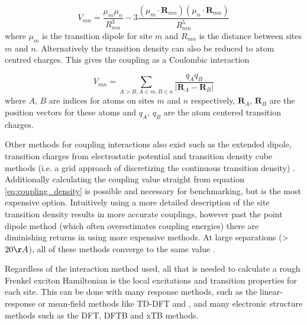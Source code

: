 \begin{equation}
    V_{mn} = \frac{\mu_m \mu_n}{R_{mn}^3} - 3 \frac{\left(\mu_m \cdot \mathbf{R}_{mn}\right) \left( \mu_n \cdot \mathbf{R}_{mn} \right)}{R_{mn}^5}
\end{equation}
%
where $\mu_m$ is the transition dipole for site $m$ and $R_{mn}$ is the distance
between sites $m$ and $n$. Alternatively the transition density can also be reduced 
to atom centred charges. This gives the coupling as a Coulombic interaction

\begin{equation}
    V_{mn} = \sum_{A>B,A \in m, B \in n}\frac{q_A q_B}{\left\lvert \mathbf{R}_A - \mathbf{R}_B \right\rvert}
\end{equation}
%
where $A$, $B$ are indices for atoms on sites $m$ and $n$ respectively, $\mathbf{R}_A$, $\mathbf{R}_B$
are the position vectors for these atoms and $q_A$, $q_B$ are the atom centered 
transition charges.

Other methods for coupling interactions also exist such as the extended dipole,
transition charges from electrostatic potential and transition density cube methods
(i.e. a grid approach of discretizing the continuous transition density) \cite{Kenny2016}. 
Additionally calculating the coupling value straight from equation \ref{eq:coupling_density} 
is possible and necessary for benchmarking, but is the most expensive option. Intuitively
using a more detailed description of the site transition density results in more 
accurate couplings, however past the point dipole method (which often overestimates
coupling energies) there are diminishing returns in using more expensive methods.
At large separations (>$20 \AA{}$), all of these methods converge to the same value \cite{Kenny2016}.

Regardless of the interaction method used, all that is needed to calculate a rough
Frenkel exciton Hamiltonian is the local excitations and transition properties for 
each site. This can be done with many response methods, such as the linear-response 
or mean-field methods like TD-DFT and \dscf, and many electronic structure methods 
such as the DFT, DFTB and xTB methods.
 
